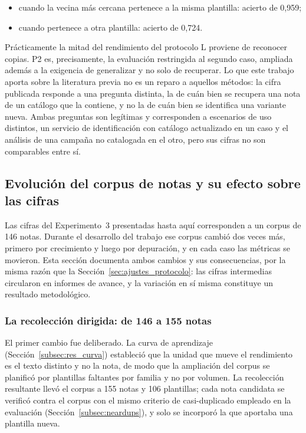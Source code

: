 \begin{itemize}
  \item cuando la vecina más cercana pertenece a la misma plantilla: acierto de 0,959;
  \item cuando pertenece a otra plantilla: acierto de 0,724.
\end{itemize}

Prácticamente la mitad del rendimiento del protocolo L proviene de reconocer copias. P2 es, precisamente, la evaluación restringida al segundo caso, ampliada además a la exigencia de generalizar y no solo de recuperar. Lo que este trabajo aporta sobre la literatura previa no es un reparo a aquellos métodos: la cifra publicada responde a una pregunta distinta, la de cuán bien se recupera una nota de un catálogo que la contiene, y no la de cuán bien se identifica una variante nueva. Ambas preguntas son legítimas y corresponden a escenarios de uso distintos, un servicio de identificación con catálogo actualizado en un caso y el análisis de una campaña no catalogada en el otro, pero sus cifras no son comparables entre sí.

\subsection{Evolución del corpus de notas y su efecto sobre las cifras}
\label{subsec:res_evolucion_corpus}

Las cifras del Experimento~3 presentadas hasta aquí corresponden a un corpus de 146 notas. Durante el desarrollo del trabajo ese corpus cambió dos veces más, primero por crecimiento y luego por depuración, y en cada caso las métricas se movieron. Esta sección documenta ambos cambios y sus consecuencias, por la misma razón que la Sección~\ref{sec:ajustes_protocolo}: las cifras intermedias circularon en informes de avance, y la variación en sí misma constituye un resultado metodológico.

\subsubsection*{La recolección dirigida: de 146 a 155 notas}

El primer cambio fue deliberado. La curva de aprendizaje (Sección~\ref{subsec:res_curva}) estableció que la unidad que mueve el rendimiento es el texto distinto y no la nota, de modo que la ampliación del corpus se planificó por plantillas faltantes por familia y no por volumen. La recolección resultante llevó el corpus a 155 notas y 106 plantillas; cada nota candidata se verificó contra el corpus con el mismo criterio de casi-duplicado empleado en la evaluación (Sección~\ref{subsec:neardups}), y solo se incorporó la que aportaba una plantilla nueva.

